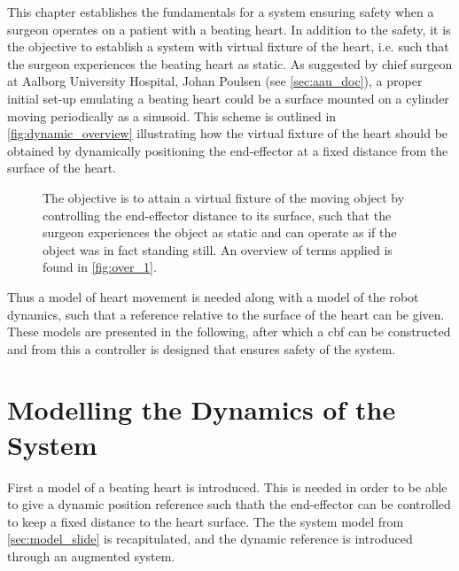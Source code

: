 This chapter establishes the fundamentals for a system ensuring safety when a surgeon operates on a patient with a beating heart. In addition to the safety, it is the objective to establish a system with virtual fixture of the heart, i.e. such that the surgeon experiences the beating heart as static. As suggested by chief surgeon at Aalborg University Hospital, Johan Poulsen (see \autoref{sec:aau_doc}), a proper initial set-up emulating a beating heart could be a surface mounted on a cylinder moving periodically as a sinusoid. This scheme is outlined in \autoref{fig:dynamic_overview} illustrating how the virtual fixture of the heart should be obtained by dynamically positioning the end-effector at a fixed distance from the surface of the heart.
\vspace{-2mm}
\begin{figure}[H]
 \hspace{0.5cm}
%
\caption{The objective is to attain a virtual fixture of the moving object by controlling the end-effector distance to its surface, such that the surgeon experiences the object as static and can operate as if the object was in fact standing still. An overview of terms applied is found in \autoref{fig:over_1}.}
\label{fig:dynamic_overview}
\end{figure}
Thus a model of  heart movement is needed along with a model of the robot dynamics, such that a reference relative to the surface of the heart can be given. These models are presented in the following, after which a \gls{cbf} can be constructed and from this a controller is designed that ensures safety of the system.
\section{Modelling the Dynamics of the System}
First a model of a beating heart is introduced. This is needed in order to be able to give a dynamic position reference such thath the end-effector can be controlled to keep a fixed distance to the heart surface.
The the system model from \autoref{sec:model_slide} is recapitulated, and the dynamic reference is introduced through an augmented system.

